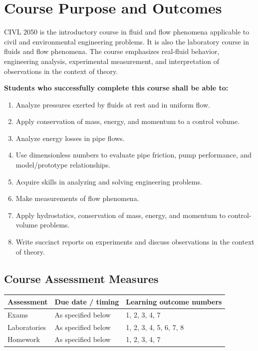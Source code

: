 \section*{Course Purpose and Outcomes}
CIVL 2050 is the introductory course in fluid and flow phenomena applicable to civil and environmental engineering problems. It is also the laboratory course in fluids and flow phenomena. The course emphasizes real-fluid behavior, engineering analysis, experimental measurement, and interpretation of observations in the context of theory.

\textbf{Students who successfully complete this course shall be able to:}
\begin{enumerate}
\item Analyze pressures exerted by fluids at rest and in uniform flow.
\item Apply conservation of mass, energy, and momentum to a control volume.
\item Analyze energy losses in pipe flows.
\item Use dimensionless numbers to evaluate pipe friction, pump performance, and model/prototype relationships.
\item Acquire skills in analyzing and solving engineering problems.
\item Make measurements of flow phenomena.
\item Apply hydrostatics, conservation of mass, energy, and momentum to control-volume problems.
\item Write succinct reports on experiments and discuss observations in the context of theory.
\end{enumerate}

\subsection*{Course Assessment Measures}
\begin{tabularx}{\textwidth}{@{}L{0.20\textwidth} L{0.25\textwidth} X@{}}
\toprule
Assessment & Due date / timing & Learning outcome numbers \\
\midrule
Exams & As specified below & 1, 2, 3, 4, 7 \\
Laboratories & As specified below & 1, 2, 3, 4, 5, 6, 7, 8 \\
Homework & As specified below & 1, 2, 3, 4, 7 \\
\bottomrule
\end{tabularx}
